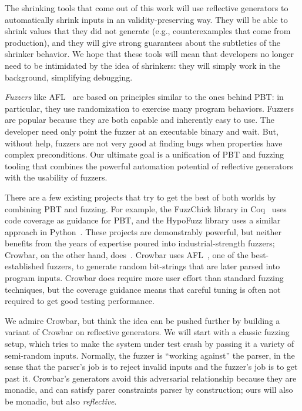 The shrinking tools that come out of this work will use reflective generators to
automatically shrink inputs in an validity-preserving way. They will be able to
shrink values that they did not generate (e.g., counterexamples that come from
production), and they will give strong guarantees about the subtleties of the
shrinker behavior. We hope that these tools will mean that developers no longer
need to be intimidated by the idea of shrinkers: they will simply work in the
background, simplifying debugging.

{\em Fuzzers} like AFL~\cite{afl-readme} are based on principles
similar to the
ones behind PBT: in particular, they use randomization to exercise many
program behaviors. Fuzzers are popular because they are both capable and
inherently easy to use. The developer need only point the fuzzer at an
executable binary and
wait. But, without help, fuzzers are not very good at finding
bugs when properties have complex preconditions.
Our ultimate goal is a unification of PBT and fuzzing tooling that combines the
powerful automation potential of reflective generators with the usability of
fuzzers.

There are a few existing projects that try to get the best of both worlds by
combining PBT and fuzzing.
For example, the FuzzChick library in Coq~\cite{OLDlampropoulos19fuzzchick}
uses code coverage as guidance for PBT, and the HypoFuzz library uses a
similar approach in Python~\cite{hatfield-dodds_hypofuzz_nodate}. These projects
are demonstrably powerful, but neither benefits from the years of expertise
poured into industrial-strength fuzzers; Crowbar, on the other hand,
does~\cite{dolan2017testing}. Crowbar uses
AFL~\cite{afl-readme}, one of the best-established
fuzzers, to generate random bit-strings that are later parsed into program
inputs. Crowbar does require more user effort than standard fuzzing techniques,
but the coverage guidance means that careful tuning is often not required to get
good testing performance.

We admire Crowbar, but think the idea can be pushed further by building
a variant of Crowbar on reflective generators.
We will start with a classic fuzzing setup, which tries to make the
system under test
crash by passing it a variety of semi-random inputs. Normally, the fuzzer is
``working against'' the parser, in the sense that the parser's job is to reject
invalid inputs and the fuzzer's job is to get past it.  Crowbar's
generators avoid this adversarial relationship because they are
monadic, and can satisfy parer constraints
parser by construction; ours will also be monadic, but also {\em reflective}.


